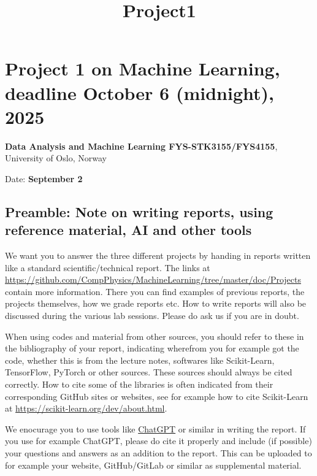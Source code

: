 \documentclass[11pt]{article}
\title{Project1}
\begin{document}
    
    \maketitle
    
    

    
    

    \hypertarget{project-1-on-machine-learning-deadline-october-6-midnight-2025}{%
\section*{Project 1 on Machine Learning, deadline October 6 (midnight),
2025}\label{project-1-on-machine-learning-deadline-october-6-midnight-2025}}

\textbf{Data Analysis and Machine Learning FYS-STK3155/FYS4155},
University of Oslo, Norway

Date: \textbf{September 2}

    \hypertarget{preamble-note-on-writing-reports-using-reference-material-ai-and-other-tools}{%
\subsection*{Preamble: Note on writing reports, using reference material,
AI and other
tools}\label{preamble-note-on-writing-reports-using-reference-material-ai-and-other-tools}}

We want you to answer the three different projects by handing in reports
written like a standard scientific/technical report. The links at
\url{https://github.com/CompPhysics/MachineLearning/tree/master/doc/Projects}
contain more information. There you can find examples of previous
reports, the projects themselves, how we grade reports etc. How to write
reports will also be discussed during the various lab sessions. Please
do ask us if you are in doubt.

When using codes and material from other sources, you should refer to
these in the bibliography of your report, indicating wherefrom you for
example got the code, whether this is from the lecture notes, softwares
like Scikit-Learn, TensorFlow, PyTorch or other sources. These sources
should always be cited correctly. How to cite some of the libraries is
often indicated from their corresponding GitHub sites or websites, see
for example how to cite Scikit-Learn at
\url{https://scikit-learn.org/dev/about.html}.

We enocurage you to use tools like
\href{https://openai.com/chatgpt/}{ChatGPT} or similar in writing the
report. If you use for example ChatGPT, please do cite it properly and
include (if possible) your questions and answers as an addition to the
report. This can be uploaded to for example your website, GitHub/GitLab
or similar as supplemental material.
\end{document}
